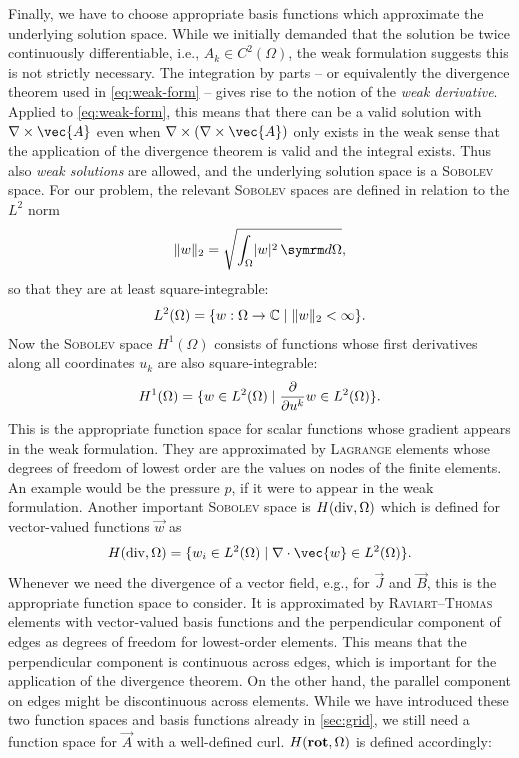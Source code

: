 Finally, we have to choose appropriate basis functions which approximate the underlying solution space. While we initially demanded that the solution be twice continuously differentiable, i.e., $A_{k} \in C^{2} (\Omega)$, the weak formulation suggests this is not strictly necessary. The integration by parts -- or equivalently the divergence theorem used in \cref{eq:weak-form} -- gives rise to the notion of the \emph{weak derivative}. Applied to \cref{eq:weak-form}, this means that there can be a valid solution with $\curl \vec{A}$ even when $\curl (\curl \vec{A})$ only exists in the weak sense that the application of the divergence theorem is valid and the integral exists. Thus also \emph{weak solutions} are allowed, and the underlying solution space is a \textsc{Sobolev} space. For our problem, the relevant \textsc{Sobolev} spaces are defined in relation to the $L^{2}$ norm
\begin{gather}
  \norm{w}_{2} = \sqrt{\int_{\Omega} \lvert w \rvert^{2} \, \diff \Omega}, \label{eq:L2-norm}
\end{gather}
so that they are at least square-integrable:
\begin{gather}
  L^{2} (\Omega) = \{ w : \Omega \to \mathbb{C} \; \vert \; \norm{w}_{2} < \infty \}.
\end{gather}
Now the \textsc{Sobolev} space $H^{1} (\Omega)$ consists of functions whose first derivatives along all coordinates $u_{k}$ are also square-integrable:
\begin{gather}
  H^{1} (\Omega) = \{ w \in L^{2} (\Omega) \; \vert \; \frac{\partial }{\partial u^{k}} w \in L^{2} (\Omega) \}.
\end{gather}
This is the appropriate function space for scalar functions whose gradient appears in the weak formulation. They are approximated by \textsc{Lagrange} elements whose degrees of freedom of lowest order are the values on nodes of the finite elements. An example would be the pressure $p$, if it were to appear in the weak formulation. Another important \textsc{Sobolev} space is $H (\operatorname{div}, \Omega)$ which is defined for vector-valued functions $\vec{w}$ as
\begin{gather}
  H (\Divg, \Omega) = \{ w_{i} \in L^{2} (\Omega) \; \vert \; \divg \vec{w} \in L^2 (\Omega) \}.
\end{gather}
Whenever we need the divergence of a vector field, e.g., for $\vec{J}$ and $\vec{B}$, this is the appropriate function space to consider. It is approximated by \textsc{Raviart}--\textsc{Thomas} elements with vector-valued basis functions and the perpendicular component of edges as degrees of freedom for lowest-order elements. This means that the perpendicular component is continuous across edges, which is important for the application of the divergence theorem. On the other hand, the parallel component on edges might be discontinuous across elements. While we have introduced these two function spaces and basis functions already in \cref{sec:grid}, we still need a function space for $\vec{A}$ with a well-defined curl. $H (\operatorname{\mathbf{rot}}, \Omega)$ is defined accordingly:
